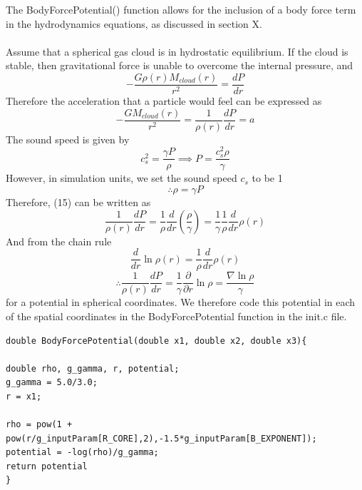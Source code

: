 \documentclass[12pt,a4paper]{report}
\begin{document}
The BodyForcePotential() function allows for the inclusion of a body force term in the hydrodynamics equations, as discussed in section X.\\
\\
Assume that a spherical gas cloud is in hydrostatic equilibrium. If the cloud is stable, then gravitational force is unable to overcome the internal pressure, and
\begin{equation}
-\frac{G\rho(r)M_{cloud}(r)}{r^2} = \frac{dP}{dr}
\end{equation}
Therefore the acceleration that a particle would feel can be expressed as
\begin{equation}
-\frac{GM_{cloud}(r)}{r^2} = \frac{1}{\rho(r)}\frac{dP}{dr} = a
\end{equation}
The sound speed is given by
\begin{equation}
c_s^2 = \frac{\gamma P}{\rho} \implies P = \frac{c_s^2 \rho}{\gamma}
\end{equation}
However, in simulation units, we set the sound speed $c_s$ to be 1
\begin{equation}
\therefore \rho = \gamma P
\end{equation}
Therefore, (15) can be written as
\begin{equation}
\frac{1}{\rho(r)}\frac{dP}{dr} = \frac{1}{\rho}\frac{d}{dr}\left( \frac{\rho}{\gamma} \right) = \frac{1}{\gamma}\frac{1}{\rho}\frac{d}{dr}\rho(r)
\end{equation}
And from the chain rule
\begin{displaymath}
\frac{d}{dr} \ln{\rho(r)} = \frac{1}{\rho}\frac{d}{dr} \rho(r)
\end{displaymath}
\begin{displaymath}
\therefore \frac{1}{\rho(r)}\frac{dP}{dr} = \frac{1}{\gamma}\frac{\partial}{\partial r}\ln{\rho} = \frac{\nabla \ln{\rho}}{\gamma}
\end{displaymath}
for a potential in spherical coordinates. We therefore code this potential in each of the spatial coordinates in the BodyForcePotential function in the init.c file.

\begin{lstlisting}
double BodyForcePotential(double x1, double x2, double x3){

double rho, g_gamma, r, potential;
g_gamma = 5.0/3.0;
r = x1;

rho = pow(1 + pow(r/g_inputParam[R_CORE],2),-1.5*g_inputParam[B_EXPONENT]);
potential = -log(rho)/g_gamma;
return potential
}
\end{lstlisting}
\end{document}
